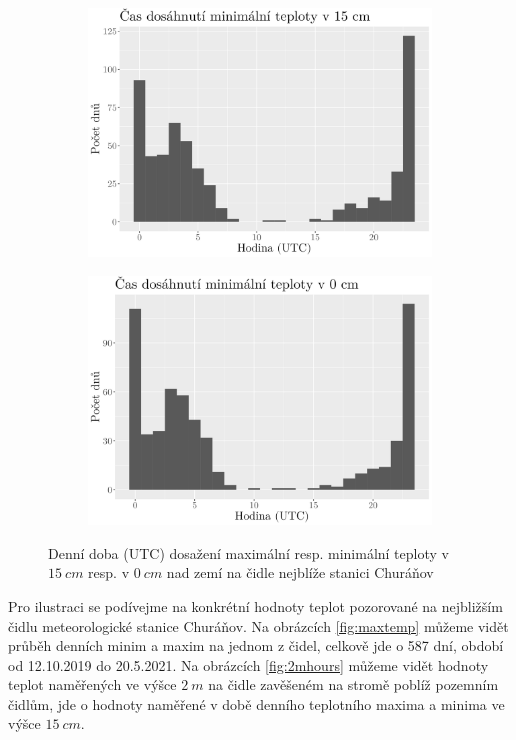 \begin{figure}
\begin{subfigure}{0.45\textwidth}
  \includegraphics[width=\textwidth]{img/hist_hourmin15cm.png}
		\caption{}
		\label{fig:hourmin15cm}
	\end{subfigure}
	\hfill
	\begin{subfigure}{0.45\textwidth}
  \includegraphics[width=\textwidth]{img/hist_hourmin0cm.png}
		\caption{}
		\label{fig:hourmin0cm}
	\end{subfigure}
	\caption{Denní doba (UTC) dosažení maximální resp. minimální teploty v $\SI{15}{cm}$ resp. v $\SI{0}{cm}$ nad zemí na čidle nejblíže stanici Churáňov}
	\label{fig:hours}
\end{figure}

Pro ilustraci se podívejme na konkrétní hodnoty teplot pozorované na nejbližším čidlu meteorologické stanice Churáňov. Na obrázcích \ref{fig:maxtemp} můžeme vidět průběh denních minim a maxim na jednom z čidel, celkově jde o 587 dní, období od 12.10.2019 do 20.5.2021. Na obrázcích \ref{fig:2mhours} můžeme vidět hodnoty teplot naměřených ve výšce $\SI{2}{m}$ na čidle zavěšeném na stromě poblíž pozemním čidlům, jde o hodnoty naměřené v době denního teplotního maxima a minima ve výšce $\SI{15}{cm}$.

